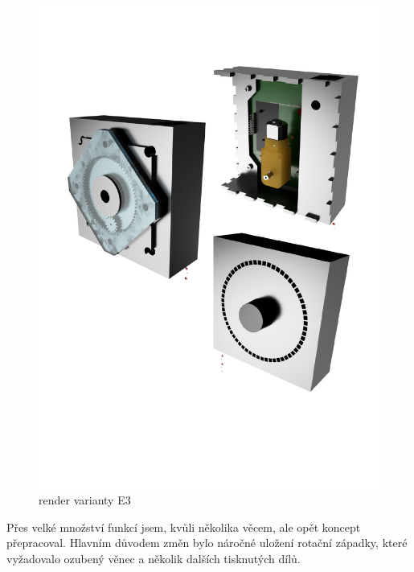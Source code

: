\begin{figure}[htbp]
    \centering
    \includegraphics[width=\textwidth]{kapitoly/obrazky/E3/rendery.pdf}
    \caption{render varianty E3}
    \label{fig:E3-renderi}
\end{figure}

Přes velké množství funkcí jsem, kvůli několika věcem, ale opět koncept přepracoval. Hlavním důvodem změn bylo náročné uložení rotační západky, 
které vyžadovalo ozubený věnec a několik dalších tisknutých dílů.

\newpage